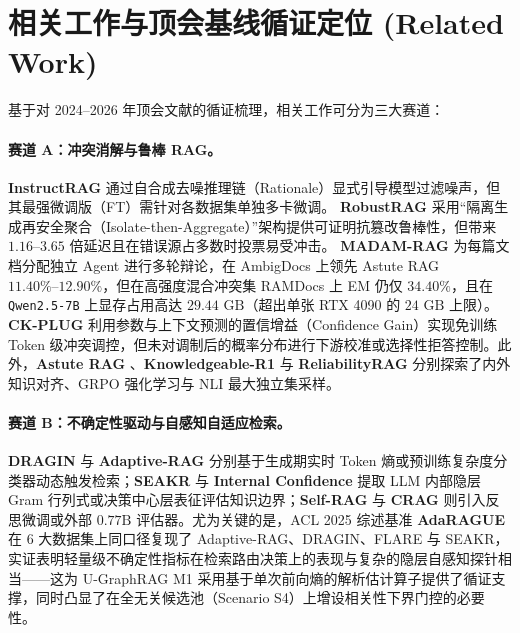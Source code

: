 \documentclass[11pt]{article}
\begin{document}
\section{相关工作与顶会基线循证定位 (Related Work)}

基于对 2024--2026 年顶会文献的循证梳理，相关工作可分为三大赛道：

\paragraph{赛道 A：冲突消解与鲁棒 RAG。}
\textbf{InstructRAG} \cite{wei2025instructrag} 通过自合成去噪推理链（Rationale）显式引导模型过滤噪声，但其最强微调版（FT）需针对各数据集单独多卡微调。 \textbf{RobustRAG} \cite{xiang2024robustrag} 采用“隔离生成再安全聚合（Isolate-then-Aggregate）”架构提供可证明抗篡改鲁棒性，但带来 $1.16\text{--}3.65$ 倍延迟且在错误源占多数时投票易受冲击。 \textbf{MADAM-RAG} \cite{wang2025madamrag} 为每篇文档分配独立 Agent 进行多轮辩论，在 AmbigDocs 上领先 Astute RAG $11.40\%\text{--}12.90\%$，但在高强度混合冲突集 RAMDocs 上 EM 仍仅 $34.40\%$，且在 \texttt{Qwen2.5-7B} 上显存占用高达 $29.44\text{ GB}$（超出单张 RTX 4090 的 $24\text{ GB}$ 上限）。 \textbf{CK-PLUG} \cite{bi2026ckplug} 利用参数与上下文预测的置信增益（Confidence Gain）实现免训练 Token 级冲突调控，但未对调制后的概率分布进行下游校准或选择性拒答控制。此外，\textbf{Astute RAG} \cite{wang2025astuterag}、\textbf{Knowledgeable-R1} \cite{knowledgeabler1_2026} 与 \textbf{ReliabilityRAG} \cite{reliabilityrag2025} 分别探索了内外知识对齐、GRPO 强化学习与 NLI 最大独立集采样。

\paragraph{赛道 B：不确定性驱动与自感知自适应检索。}
\textbf{DRAGIN} \cite{su2024dragin} 与 \textbf{Adaptive-RAG} \cite{jeong2024adaptiverag} 分别基于生成期实时 Token 熵或预训练复杂度分类器动态触发检索；\textbf{SEAKR} \cite{yao2025seakr} 与 \textbf{Internal Confidence} \cite{chen2026internalconfidence} 提取 LLM 内部隐层 Gram 行列式或决策中心层表征评估知识边界；\textbf{Self-RAG} \cite{asai2024selfrag} 与 \textbf{CRAG} \cite{yan2024crag} 则引入反思微调或外部 $0.77\text{B}$ 评估器。尤为关键的是，ACL 2025 综述基准 \textbf{AdaRAGUE} \cite{adarague2025} 在 6 大数据集上同口径复现了 Adaptive-RAG、DRAGIN、FLARE 与 SEAKR，实证表明轻量级不确定性指标在检索路由决策上的表现与复杂的隐层自感知探针相当——这为 U-GraphRAG M1 采用基于单次前向熵的解析估计算子提供了循证支撑，同时凸显了在全无关候选池（Scenario S4）上增设相关性下界门控的必要性。
\end{document}
